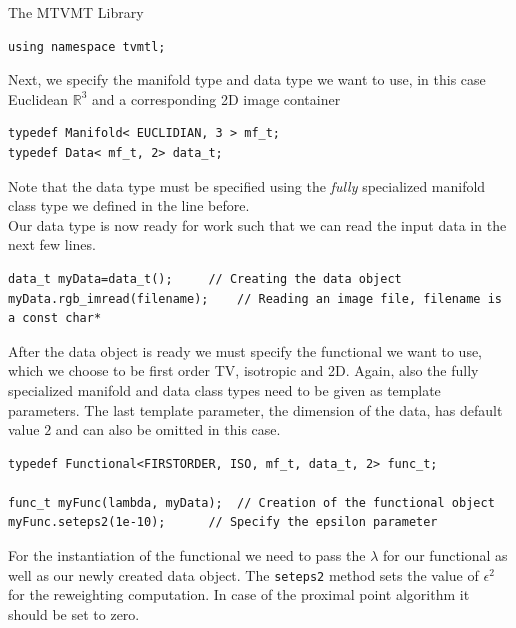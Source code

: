 \begin{chapter}{The MTVMT Library}
\begin{lstlisting}[label=code:tut_include,caption={Inclusion of library headers}]
using namespace tvmtl;
\end{lstlisting}

Next, we specify the manifold type and data type we want to use, in this case Euclidean $\mathbb{R}^3$ and a corresponding 2D image container\\

\cppinline
\begin{lstlisting}[label=code:tut_typedef,caption={Specification of manifold and data type}]
typedef Manifold< EUCLIDIAN, 3 > mf_t;
typedef Data< mf_t, 2> data_t;
\end{lstlisting}

Note that the data type must be specified using the \textit{fully} specialized manifold class type we defined in the line before.\\
Our data type is now ready for work such that we can read the input data in the next few lines.\\

\cppinline
\begin{lstlisting}[label=code:tut_data,caption={Initialization and input of image data}]
data_t myData=data_t();		// Creating the data object
myData.rgb_imread(filename);	// Reading an image file, filename is a const char*
\end{lstlisting}

After the data object is ready we must specify the functional we want to use, which we choose to be first order TV, isotropic and 2D. Again,
also the fully specialized manifold and data class types need to be given as template parameters. The last template parameter, the dimension of the data, 
has default value $2$ and can also be omitted in this case.\\

\cppinline
\begin{lstlisting}[label=code:tut_func,caption={Defining the functional and setting parameters}]
typedef Functional<FIRSTORDER, ISO, mf_t, data_t, 2> func_t;

func_t myFunc(lambda, myData);  // Creation of the functional object
myFunc.seteps2(1e-10);		// Specify the epsilon parameter 
\end{lstlisting}

For the instantiation of the functional we need to pass the $\lambda$ for our functional as well as our newly created data object. The \texttt{seteps2} method
sets the value of $\epsilon^2$ for the reweighting computation. In case of the proximal point algorithm it should be set to zero.\\


\end{chapter}
